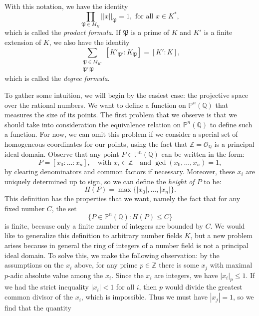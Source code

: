 \documentclass[a4paper, 12pt]{amsart}
\theoremstyle{definition}
\theoremstyle{plain}
\theoremstyle{plain}
\theoremstyle{plain}
\theoremstyle{plain}
\theoremstyle{remark}
\theoremstyle{remark}
\theoremstyle{plain}
\newcommand{\Q}{\mathbb{Q}}
\newcommand{\Z}{\mathbb{Z}}
\renewcommand{\P}{\mathfrak{P}}
\begin{document}
	With this notation, we have the identity
	\begin{equation}\label{productformula}
		\prod_{\P\in M_K}||x||_\P=1,\text{ for all } x\in K^*,
	\end{equation}
	which is called the \emph{product formula}. If $\P$ is a prime of $K$ and $K'$ is a finite extension of $K$, we also have the identity
	\begin{equation}\label{degreeformula}
		\sum_{\substack{\P\in M_{K'}\\\P'|\P}}[K'_{\P'}:K_\P]=[K':K],
	\end{equation}
	which is called the \emph{degree formula}.
	
	To gather some intuition, we will begin by the easiest case: the projective space over the rational numbers. We want to define a function on $\mathbb{P}^n(\Q)$ that measures the size of its points. The first problem that we observe is that we should take into consideration the equivalence relation on $\mathbb{P}^n(\Q)$ to define such a function. For now, we can omit this problem if we consider a special set of homogeneous coordinates for our points, using the fact that $\Z=\mathcal{O}_\Q$ is a principal ideal domain. Observe that any point $P\in\mathbb{P}^n(\Q)$ can be written in the form:
	\begin{equation}\label{coordinates}
		P=[x_0:\ldots:x_n],\quad\text{with } x_i\in\Z\quad\text{and } \gcd(x_0,\ldots,x_n)=1,
	\end{equation}
	by clearing denominators and common factors if necessary. Moreover, these $x_i$ are uniquely determined up to sign, so we can define the \emph{height of $P$} to be:
	\begin{equation*}
		H(P)=\max\{|x_0|,\ldots,|x_n|\}.
	\end{equation*}
	This definition has the properties that we want, namely the fact that for any fixed number $C$, the set
	\begin{equation*}
		\{P\in\mathbb{P}^n(\Q): H(P)\le C\}
	\end{equation*}
	is finite, because only a finite number of integers are bounded by $C$. We would like to generalize this definition to arbitrary number fields $K$, but a new problem arises because in general the ring of integers of a number field is not a principal ideal domain. To solve this, we make the following observation: by the assumptions on the $x_i$ above, for any prime $p\in\Z$ there is some $x_j$ with maximal $p$-adic absolute value among the $x_i$. Since the $x_i$ are integers, we have $|x_i|_p\le 1$. If we had the strict inequality $|x_i|<1$ for all $i$, then $p$ would divide the greatest common divisor of the $x_i$, which is impossible. Thus we must have $|x_j|=1$, so we find that the quantity
\end{document}
